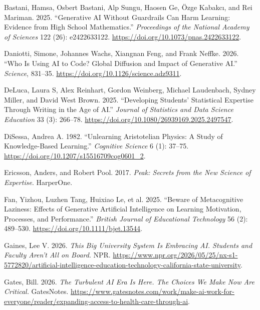 \documentclass[
]{hdsr}
\newlength{\cslhangindent}
\newenvironment{CSLReferences}[2] %
 {\begin{list}{}{%
  \setlength{\itemindent}{0pt}
  \setlength{\leftmargin}{0pt}
  \setlength{\parsep}{0pt}
  \ifodd #1
   \setlength{\leftmargin}{\cslhangindent}
   \setlength{\itemindent}{-1\cslhangindent}
  \fi
  \setlength{\itemsep}{#2\baselineskip}}}
 {\end{list}}
\begin{document}
\protect{}\label{refs}
\begin{CSLReferences}{1}{1}
Bastani, Hamsa, Osbert Bastani, Alp Sungu, Haosen Ge, Özge Kabakcı, and
Rei Mariman. 2025. {``Generative {AI} Without Guardrails Can Harm
Learning: Evidence from High School Mathematics.''} \emph{Proceedings of
the National Academy of Sciences} 122 (26): e2422633122.
\url{https://doi.org/10.1073/pnas.2422633122}.

Daniotti, Simone, Johannes Wachs, Xiangnan Feng, and Frank Neffke. 2026.
{``Who Is Using {AI} to Code? Global Diffusion and Impact of Generative
{AI}.''} \emph{Science}, 831--35.
\url{https://doi.org/10.1126/science.adz9311}.

DeLuca, Laura S, Alex Reinhart, Gordon Weinberg, Michael Laudenbach,
Sydney Miller, and David West Brown. 2025. {``Developing Students'
Statistical Expertise Through Writing in the Age of {AI}.''}
\emph{Journal of Statistics and Data Science Education} 33 (3): 266--78.
\url{https://doi.org/10.1080/26939169.2025.2497547}.

DiSessa, Andrea A. 1982. {``Unlearning Aristotelian Physics: A Study of
Knowledge-Based Learning.''} \emph{Cognitive Science} 6 (1): 37--75.
\url{https://doi.org/10.1207/s15516709cog0601_2}.

Ericsson, Anders, and Robert Pool. 2017. \emph{Peak: Secrets from the
New Science of Expertise}. HarperOne.

Fan, Yizhou, Luzhen Tang, Huixiao Le, et al. 2025. {``Beware of
Metacognitive Laziness: Effects of Generative Artificial Intelligence on
Learning Motivation, Processes, and Performance.''} \emph{British
Journal of Educational Technology} 56 (2): 489--530.
\url{https://doi.org/10.1111/bjet.13544}.

Gaines, Lee V. 2026. \emph{This Big University System Is Embracing {AI}.
Students and Faculty Aren't All on Board}. NPR.
\url{https://www.npr.org/2026/05/25/nx-s1-5772820/artificial-intelligence-education-technology-california-state-university}.

Gates, Bill. 2026. \emph{The Turbulent {AI} Era Is Here. The Choices We
Make Now Are Critical.} GatesNotes.
\url{https://www.gatesnotes.com/work/make-ai-work-for-everyone/reader/expanding-access-to-health-care-through-ai}.


\end{CSLReferences}
\end{document}
